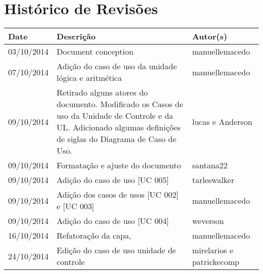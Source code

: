\documentclass{article}
\begin{document}

\capa
\newpage

\section*{\center Histórico de Revisões}
  \vspace*{1cm}
  \begin{table}[ht]
    \centering
    \begin{tabular}[pos]{|m{2cm} | m{7.2cm} | m{3.8cm}|} 
      \hline
      \cellcolor[gray]{0.9}
      \textbf{Date} & \cellcolor[gray]{0.9}\textbf{Descrição} & \cellcolor[gray]{0.9}\textbf{Autor(s)}\\ \hline
      
      \small 03/10/2014 & \small Document conception & \small manuellemacedo \\ \hline      
	
      \small 07/10/2014 & \small Adição do caso de uso da unidade lógica e aritmética & \small manuellemacedo \\ \hline
      \small 09/10/2014 & \small Retirado alguns atores do documento. Modificado os Casos de uso da Unidade de Controle e da UL. Adicionado algumas definições de siglas do Diagrama de Caso de Uso. & \small lucas e Anderson \\ \hline 
      \small 09/10/2014 & \small Formatação e ajuste do documento & \small santana22 \\ \hline
      \small 09/10/2014 & \small Adição do caso de uso [UC 005] & \small tarleswalker \\ \hline
      \small 09/10/2014 & \small Adição dos casos de usos [UC 002] e [UC 003] & \small manuellemacedo \\ \hline
       \small 09/10/2014 & \small Adição do caso de uso [UC 004] & \small weverson \\ \hline
       \small 16/10/2014 & \small Refatoração da capa,  & \small manuellemacedo \\ \hline
       \small 24/10/2014 & \small Edição do caso de uso unidade de controle  & \small mirelarios e patrickecomp \\ \hline
    \end{tabular}
  \end{table}
\end{document}
